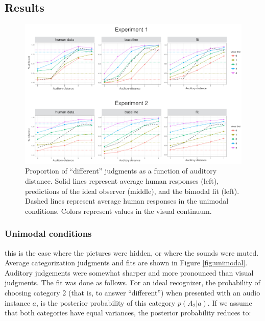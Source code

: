 \documentclass[10pt,letterpaper]{article}
\begin{document}
\subsection{Results}
%

\begin{figure}[t]
\centering
\includegraphics[width=.83\textwidth]{Exp.png}
\caption{Proportion of ``different'' judgments as a function of auditory distance. Solid lines represent average human responses (left), predictions of the ideal observer (middle), and the bimodal fit (left). Dashed lines represent average human responses in the unimodal conditions. Colors represent values in the visual continuum.}
\label{fig:Exp}
\end{figure}

\subsubsection{Unimodal conditions} this is the case where the pictures were hidden, or where the sounds were muted.
Average categorization judgments and fits are shown in Figure \ref{fig:unimodal}. Auditory judgements were somewhat sharper and more pronounced than visual judgments. The fit was done as follows. For an ideal recognizer, the probability of choosing category 2 (that is, to answer ``different'') when presented with an audio instance $a$, is the posterior probability of this category $p(A_2|a)$. If we assume that both categories have equal variances, the posterior probability reduces to:
\end{document}
